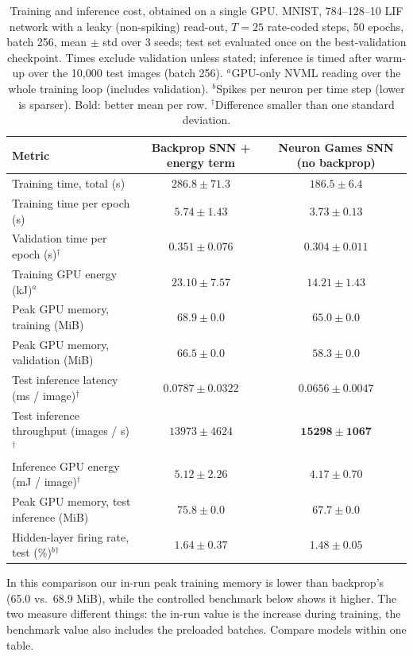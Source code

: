 \documentclass{article}
\begin{document}
\begin{table}[H]
\centering
\small
\caption{Training and inference cost, obtained on a single GPU. MNIST, 784--128--10 LIF network with a leaky (non-spiking) read-out, $T=25$ rate-coded steps, 50 epochs, batch 256, mean $\pm$ std over 3 seeds; test set evaluated once on the best-validation checkpoint. Times exclude validation unless stated; inference is timed after warm-up over the 10{,}000 test images (batch 256). $^a$GPU-only NVML reading over the whole training loop (includes validation). $^b$Spikes per neuron per time step (lower is sparser). Bold: better mean per row. $^\dagger$Difference smaller than one standard deviation.}
\label{tab:t2-cost}
\begin{tabular}{lcc}
\toprule
Metric & Backprop SNN + energy term & Neuron Games SNN (no backprop) \\
\midrule
Training time, total (s) & $286.8 \pm 71.3$ & $\boldsymbol{186.5 \pm 6.4}$ \\
Training time per epoch (s) & $5.74 \pm 1.43$ & $\boldsymbol{3.73 \pm 0.13}$ \\
Validation time per epoch (s)$^\dagger$ & $0.351 \pm 0.076$ & $\boldsymbol{0.304 \pm 0.011}$ \\
Training GPU energy (kJ)$^a$ & $23.10 \pm 7.57$ & $\boldsymbol{14.21 \pm 1.43}$ \\
Peak GPU memory, training (MiB) & $68.9 \pm 0.0$ & $\boldsymbol{65.0 \pm 0.0}$ \\
Peak GPU memory, validation (MiB) & $66.5 \pm 0.0$ & $\boldsymbol{58.3 \pm 0.0}$ \\
\midrule
Test inference latency (ms / image)$^\dagger$ & $0.0787 \pm 0.0322$ & $\boldsymbol{0.0656 \pm 0.0047}$ \\
Test inference throughput (images / s)$^\dagger$ & $13973 \pm 4624$ & $\boldsymbol{15298 \pm 1067}$ \\
Inference GPU energy (mJ / image)$^\dagger$ & $5.12 \pm 2.26$ & $\boldsymbol{4.17 \pm 0.70}$ \\
Peak GPU memory, test inference (MiB) & $75.8 \pm 0.0$ & $\boldsymbol{67.7 \pm 0.0}$ \\
\midrule
Hidden-layer firing rate, test (\%)$^b$$^\dagger$ & $1.64 \pm 0.37$ & $\boldsymbol{1.48 \pm 0.05}$ \\
\bottomrule
\end{tabular}
\end{table}

{\small
\noindent In this comparison our in-run peak training memory is lower than backprop's (65.0 vs.\ 68.9 MiB), while
the controlled benchmark below shows it higher. The two measure different things: the in-run value is the
increase during training, the benchmark value also includes the preloaded batches. Compare models within one table.
}
\end{document}
